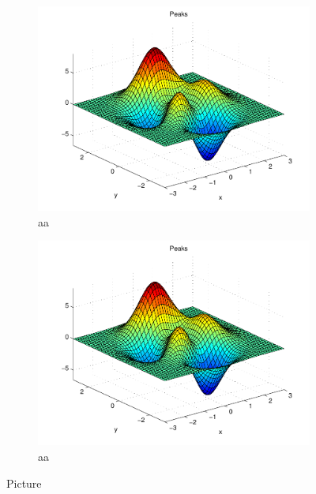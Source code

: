 \begin{figure}[h]
\begin{subfigure}[b]{0.45\textwidth}
	\includegraphics[width=\textwidth]{mcmthesis-aaa-eps-converted-to.pdf}
	\caption{aa} 
	\label{fig:aa3}
\end{subfigure}
\begin{subfigure}[b]{0.45\textwidth}
	\includegraphics[width=\textwidth]{mcmthesis-aaa-eps-converted-to.pdf}
	\caption{aa} 
	\label{fig:aa4}
\end{subfigure}
\caption{Picture}
\label{fig:aa}
\end{figure}